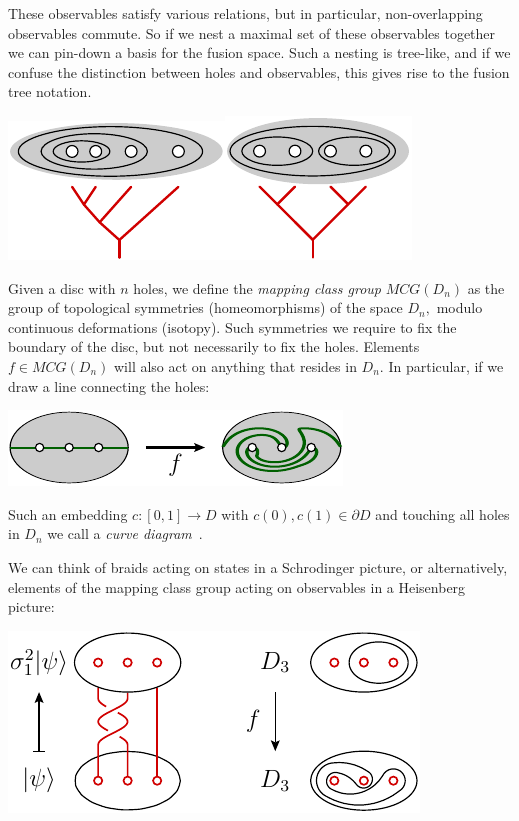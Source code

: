 \documentclass[aps, prl, letterpaper, twocolumn, superscriptaddress, notitlepage, 10pt]{revtex4-1}
\begin{document}
These observables satisfy various relations,
but in particular, non-overlapping observables commute.
So if we nest a maximal set of these observables together
we can pin-down a basis for the fusion space.
Such a nesting is tree-like, and if we confuse the distinction
between holes and observables, this gives rise to the
fusion tree notation.
\begin{center}
\includegraphics[]{pic-tree-0.pdf}\includegraphics[]{pic-tree-1.pdf}
\end{center}

Given a disc with $n$ holes, we define the \emph{mapping
class group} $MCG(D_n)$ as the group of topological
symmetries (homeomorphisms) of the space $D_n,$
modulo continuous deformations (isotopy).
Such symmetries we require to fix the boundary
of the disc, but not necessarily to fix the holes.
Elements $f\in MCG(D_n)$ will also act on anything that
resides in $D_n.$ 
In particular, if we draw a line
connecting the holes:
\begin{center}
\includegraphics[]{pic-twist.pdf}
\end{center}

Such an embedding $c : [0, 1] \to D$ with $c(0), c(1) \in \partial D$
and touching all holes in $D_n$ we call a \emph{curve diagram}~\cite{Dehornoy2002}.

We can think of braids acting on states in a Schrodinger picture,
or alternatively, elements of the mapping class group acting on
observables in a Heisenberg picture:
\begin{center}
\includegraphics[]{pic-interaction.pdf}
\end{center}
\end{document}
